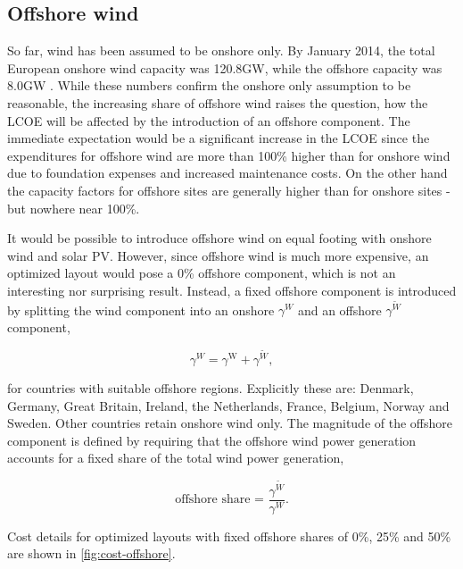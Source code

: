 \documentclass[a4paper, 5p, sort&compress]{elsarticle}%
\begin{document}
{\subsection{Offshore wind}
\label{sec:offshore-wind}

So far, wind has been assumed to be onshore only. By January 2014, the
total European onshore wind capacity was 120.8GW, while the offshore
capacity was 8.0GW \cite{EWEA}. While these numbers confirm the
onshore only assumption to be reasonable, the increasing share of
offshore wind raises the question, how the LCOE will be affected by
the introduction of an offshore component. The immediate expectation
would be a significant increase in the LCOE since the expenditures for
offshore wind are more than 100\% higher than for onshore wind due to
foundation expenses and increased maintenance costs. On the other hand
the capacity factors for offshore sites are generally higher than for
onshore sites - but nowhere near 100\%.

It would be possible to introduce offshore wind on equal footing with
onshore wind and solar PV. However, since offshore wind is much more
expensive, an optimized layout would pose a 0\% offshore component,
which is not an interesting nor surprising result. Instead, a fixed
offshore component is introduced by splitting the wind component into
an onshore $\gamma^{W}$ and an offshore $\gamma^{\tilde{W}}$ component,

\begin{equation}
  \label{eq:11}
  \gamma^{W} = \gamma^{\text{W}} + \gamma^{\text{$\tilde{W}$}}, 
\end{equation}

for countries with suitable offshore regions. Explicitly these are:
Denmark, Germany, Great Britain, Ireland, the Netherlands, France,
Belgium, Norway and Sweden. Other countries retain onshore wind
only. The magnitude of the offshore component is defined by requiring
that the offshore wind power generation accounts for a fixed share of
the total wind power generation,

\begin{equation}
  \label{eq:12}
  \text{offshore share = }\frac{\gamma^{\tilde{W}}}{\gamma^{W}}.
\end{equation}

Cost details for optimized layouts with fixed offshore shares of 0\%, 25\% and
50\% are shown in \cref{fig:cost-offshore}.

}
\end{document}
